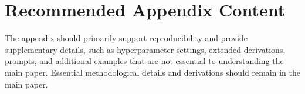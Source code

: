 \documentclass[9pt]{ieeeconf}
\begin{document}
\section{Recommended Appendix Content}
\label{sec:appendix_content}

The appendix should primarily support reproducibility and provide
supplementary details, such as hyperparameter settings, extended
derivations, prompts, and additional examples that are not
essential to understanding the main paper. Essential methodological
details and derivations should remain in the main paper.
\end{document}
